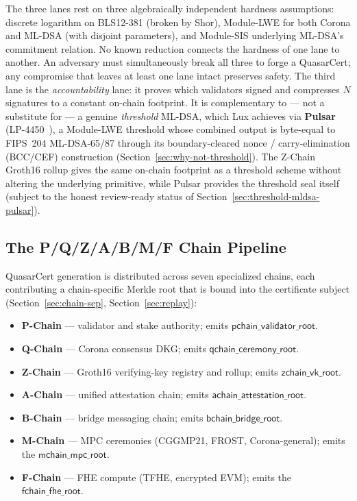 The three lanes rest on three algebraically independent hardness assumptions:
discrete logarithm on BLS12-381 (broken by Shor), Module-LWE for both
Corona and ML-DSA (with disjoint parameters), and Module-SIS underlying
ML-DSA's commitment relation. No known reduction connects the hardness of
one lane to another. An adversary must simultaneously break all three to
forge a QuasarCert; any compromise that leaves at least one lane intact
preserves safety. The third lane is the \emph{accountability} lane: it
proves which validators signed and compresses $N$ signatures to a
constant on-chain footprint. It is complementary to --- not a substitute
for --- a genuine \emph{threshold} ML-DSA, which Lux achieves via
\textbf{Pulsar} (LP-4450~\cite{lp4450}), a Module-LWE threshold whose
combined output is byte-equal to FIPS~204 ML-DSA-65/87 through its
boundary-cleared nonce / carry-elimination (BCC/CEF) construction
(Section~\ref{sec:why-not-threshold}). The Z-Chain Groth16 rollup gives
the same on-chain footprint as a threshold scheme without altering the
underlying primitive, while Pulsar provides the threshold seal itself
(subject to the honest review-ready status of
Section~\ref{sec:threshold-mldsa-pulsar}).

\subsection{The P/Q/Z/A/B/M/F Chain Pipeline}

QuasarCert generation is distributed across seven specialized chains, each
contributing a chain-specific Merkle root that is bound into the
certificate subject (Section~\ref{sec:chain-sep},
Section~\ref{sec:replay}):

\begin{itemize}[leftmargin=2em,nosep]
\item \textbf{P-Chain} --- validator and stake authority; emits
      $\mathsf{pchain\_validator\_root}$.
\item \textbf{Q-Chain} --- Corona consensus DKG; emits
      $\mathsf{qchain\_ceremony\_root}$.
\item \textbf{Z-Chain} --- Groth16 verifying-key registry and rollup; emits
      $\mathsf{zchain\_vk\_root}$.
\item \textbf{A-Chain} --- unified attestation chain; emits
      $\mathsf{achain\_attestation\_root}$.
\item \textbf{B-Chain} --- bridge messaging chain; emits
      $\mathsf{bchain\_bridge\_root}$.
\item \textbf{M-Chain} --- MPC ceremonies (CGGMP21, FROST,
      Corona-general); emits the $\mathsf{mchain\_mpc\_root}$.
\item \textbf{F-Chain} --- FHE compute (TFHE, encrypted EVM); emits the
      $\mathsf{fchain\_fhe\_root}$.
\end{itemize}


